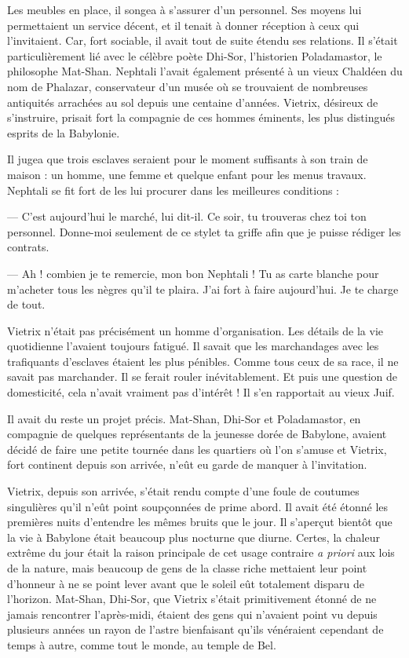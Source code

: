 \documentclass[a4paper, 11pt, oneside, polutonikogreek, french]{article}
\begin{document}
Les meubles en place, il songea à s'assurer d'un personnel. Ses moyens lui permettaient un service décent, et il tenait à donner réception à ceux qui l'invitaient. Car, fort sociable, il avait tout de suite étendu ses relations. Il s'était particulièrement lié avec le célèbre poète Dhi-Sor, l'historien Poladamastor, le philosophe Mat-Shan. Nephtali l'avait également présenté à un vieux Chaldéen du nom de Phalazar, conservateur d'un musée où se trouvaient de nombreuses antiquités arrachées au sol depuis une centaine d'années. Vietrix, désireux de s'instruire, prisait fort la compagnie de ces hommes éminents, les plus distingués esprits de la Babylonie.

\bigskip
\centerline{\EightStarTaper}
\centerline{\EightStarTaper\EightStarTaper}
\bigskip

Il jugea que trois esclaves seraient pour le moment suffisants à son train de maison : un homme, une femme et quelque enfant pour les menus travaux. Nephtali se fit fort de les lui procurer dans les meilleures conditions :

--- C'est aujourd'hui le marché, lui dit-il. Ce soir, tu trouveras chez toi ton personnel. Donne-moi seulement de ce stylet ta griffe afin que je puisse rédiger les contrats.

--- Ah ! combien je te remercie, mon bon Nephtali ! Tu as carte blanche pour m'acheter tous les nègres qu'il te plaira. J'ai fort à faire aujourd'hui. Je te charge de tout.

Vietrix n'était pas précisément un homme d'organisation. Les détails de la vie quotidienne l'avaient toujours fatigué. Il savait que les marchandages avec les trafiquants d'esclaves étaient les plus pénibles. Comme tous ceux de sa race, il ne savait pas marchander. Il se ferait rouler inévitablement. Et puis une question de domesticité, cela n'avait vraiment pas d'intérêt ! Il s'en rapportait au vieux Juif.

Il avait du reste un projet précis. Mat-Shan, Dhi-Sor et Poladamastor, en compagnie de quelques représentants de la jeunesse dorée de Babylone, avaient décidé de faire une petite tournée dans les quartiers où l'on s'amuse et Vietrix, fort continent depuis son arrivée, n'eût eu garde de manquer à l'invitation.

\bigskip
\centerline{\EightStarTaper}
\centerline{\EightStarTaper\EightStarTaper}
\bigskip

Vietrix, depuis son arrivée, s'était rendu compte d'une foule de coutumes singulières qu'il n'eût point soupçonnées de prime abord. Il avait été étonné les premières nuits d'entendre les mêmes bruits que le jour. Il s'aperçut bientôt que la vie à Babylone était beaucoup plus nocturne que diurne. Certes, la chaleur extrême du jour était la raison principale de cet usage contraire \emph{a priori} aux lois de la nature, mais beaucoup de gens de la classe riche mettaient leur point d'honneur à ne se point lever avant que le soleil eût totalement disparu de l'horizon. Mat-Shan, Dhi-Sor, que Vietrix s'était primitivement étonné de ne jamais rencontrer l'après-midi, étaient des gens qui n'avaient point vu depuis plusieurs années un rayon de l'astre bienfaisant qu'ils vénéraient cependant de temps à autre, comme tout le monde, au temple de Bel.
\end{document}
